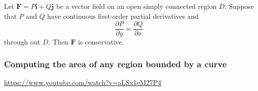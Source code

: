 \documentclass[aspectratio=169]{beamer}
\begin{document}
\begin{frame}
\begin{theorem}
Let \(\mathbf{F} = P\mathbf{i} + Q\mathbf{j}\) be a vector field on an open simply connected
region \(D\). Suppose that
\(P\) and \(Q\) have continuous first-order partial derivatives and
\begin{equation*}
    \frac{\partial P}{\partial y} = \frac{\partial Q}{\partial x}
\end{equation*}
through out \(D\).
Then \(\mathbf{F}\) is conservative.
\end{theorem}
\end{frame}

\begin{frame}
    \frametitle{Computing the area of any region bounded by a curve}
    \url{https://www.youtube.com/watch?v=aLSx1eM27P4}
\end{frame}
\end{document}
